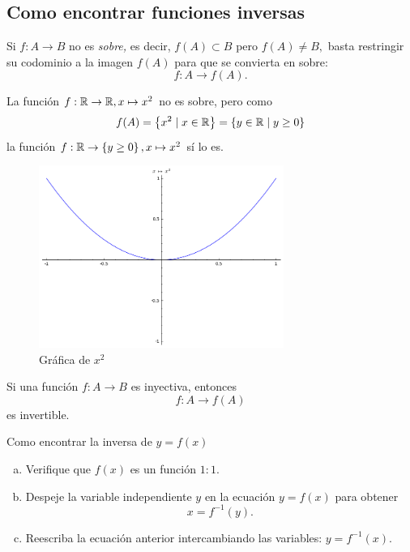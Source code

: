 \subsection{Como encontrar funciones inversas}


Si $f:A \to B$ no es \emph{sobre,} es decir, $f(A) \subset B$ pero $f(A)\neq B,$ basta restringir su codominio a la imagen $f(A)$ para que se convierta en {sobre}:
$$
f: A \to f(A).
$$



\begin{problema}
La función $f:\mathbb{R} \to \mathbb{R}, x \mapsto x^{2}$ no es sobre, pero como 
$$f(A)=\left\{ x^2\mid x\in\mathbb{R} \right\}=\left\{ y\in \mathbb{R} \mid y\geq 0 \right\}$$
la función $f: \mathbb{R}\to \left\{ y \geq 0 \right\}, x \mapsto x^{2}$ sí lo es.
\end{problema}




\begin{figure}[h!]
\centering
\includegraphics[width=8cm,keepaspectratio=true]{./md/IMG-04_resticcion.png}
\caption{Gráfica de $x^2$}
\label{fig:0401}
\end{figure}




\begin{prop}
Si una función $f:A \to B$ es inyectiva, entonces
$$
f:A \to f(A)
$$ es invertible.
\end{prop}



{Como encontrar la inversa de $y=f(x)$}
\begin{enumerate}[(a)]
\item Verifique que $f(x)$ es un función $1:1.$ 
\item Despeje la variable independiente $y$ en la ecuación $y=f(x)$ para obtener
$$x=f^{-1}(y).$$ 
\item Reescriba la ecuación anterior intercambiando las variables: $y=f^{-1}(x).$
\end{enumerate}




